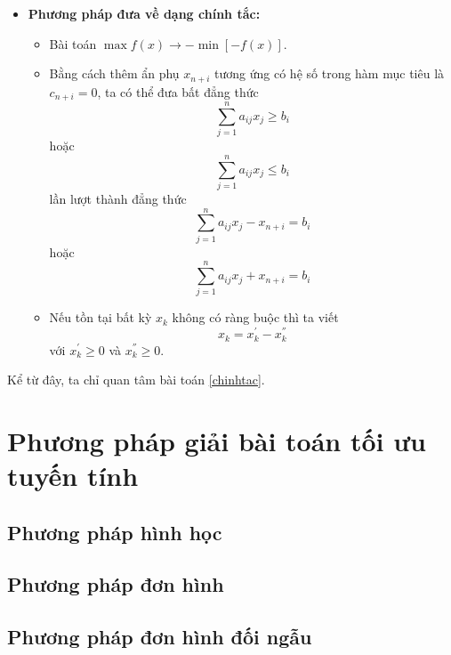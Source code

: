 \documentclass[12pt,a4paper]{report}
\begin{document}
\begin{itemize}
\item \textbf{Phương pháp đưa về dạng chính tắc:}
    \begin{itemize}
    \item Bài toán $\max f(x) \longrightarrow -\min [-f(x)]$.
    \item Bằng cách thêm ẩn phụ $x_{n+i}$ tương ứng có hệ số trong hàm mục tiêu là $c_{n+i}=0$, ta có thể đưa bất đẳng thức 
    \begin{equation*}
    \sum _{j=1}^n a_{ij} x_j \geq b_i
    \end{equation*}
    hoặc
    \begin{equation*}
    \sum _{j=1}^n a_{ij} x_j \leq b_i
    \end{equation*}
    lần lượt thành đẳng thức
    \begin{equation*}
    \sum _{j=1}^n a_{ij} x_j - x_{n+i} = b_i
    \end{equation*}
    hoặc
    \begin{equation*}
    \sum _{j=1}^n a_{ij} x_j + x_{n+i} = b_i
    \end{equation*}
    \item Nếu tồn tại bất kỳ $x_k$ không có ràng buộc thì ta viết
    \begin{equation*}
    x_k = x_k^{'} - x_k^{''}
    \end{equation*}
    với $x_k^{'} \geq 0$ và $x_k^{''} \geq 0$.
    \end{itemize}
\end{itemize}
Kể từ đây, ta chỉ quan tâm bài toán \eqref{chinhtac}.

\section{Phương pháp giải bài toán tối ưu tuyến tính}

\subsection{Phương pháp hình học}

\subsection{Phương pháp đơn hình}
\subsection{Phương pháp đơn hình đối ngẫu}
\end{document}
